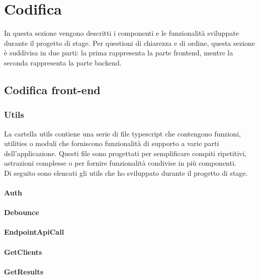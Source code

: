 
\section{Codifica}
In questa sezione vengono descritti i componenti e le funzionalità sviluppate durante il progetto di stage. 
Per questioni di chiarezza e di ordine, questa sezione è suddivisa in due parti: la prima rappresenta la parte frontend, mentre la seconda rappresenta la parte backend.
\subsection{Codifica front-end}\label{subsec:codifica-front-end}

\subsubsection{Utils}\label{subsubsec:utils}
La cartella utils contiene una serie di file typescript che contengono funzioni, utilities o moduli che forniscono funzionalità di supporto a varie parti dell'applicazione.
Questi file sono progettati per semplificare compiti ripetitivi, astrazioni complesse o per fornire funzionalità condivise in più componenti.\\
Di seguito sono elencati gli utils che ho sviluppato durante il progetto di stage.

\paragraph{Auth}\label{par:auth-utils}
\paragraph{Debounce}\label{par:debounce}
\paragraph{EndpointApiCall}\label{par:endpoint-api-call}
\paragraph{GetClients}\label{par:get-clients}
\paragraph{GetResults}\label{par:get-results}
